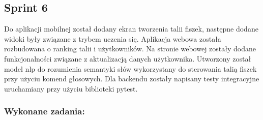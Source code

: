 \subsection{Sprint 6}

Do aplikacji mobilnej został dodany ekran tworzenia talii fiszek, następne dodane widoki były związane z trybem uczenia się. Aplikacja webowa została rozbudowana o ranking talii i użytkowników. Na stronie webowej zostały dodane funkcjonalności związane z aktualizacją danych użytkownika. Utworzony został model nlp do rozumienia semantyki słów wykorzystany do sterowania talią fiszek przy użyciu komend głosowych. Dla backendu zostały napisany testy integracyjne uruchamiany przy użyciu biblioteki pytest.

\subsubsection{Wykonane zadania:}

